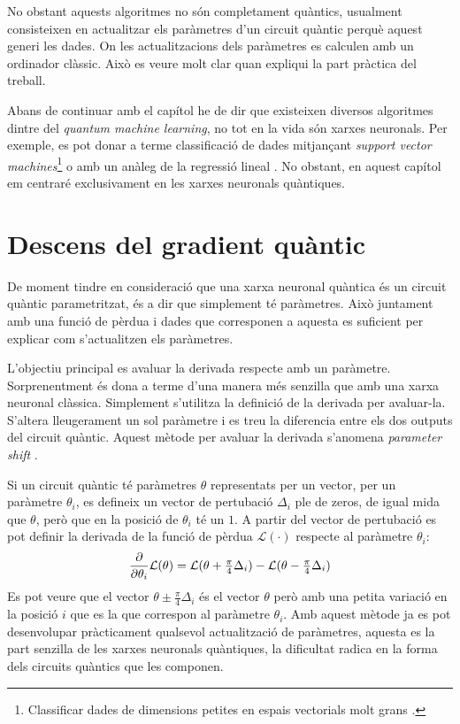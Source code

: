 No obstant aquests algoritmes no són completament quàntics, usualment consisteixen en actualitzar els paràmetres d'un circuit quàntic perquè aquest generi les dades. On les actualitzacions dels paràmetres es calculen amb un ordinador clàssic. Això es veure molt clar quan expliqui la part pràctica del treball. 

Abans de continuar amb el capítol he de dir que existeixen diversos algoritmes dintre del \textit{quantum machine learning}, no tot en la vida són xarxes neuronals. Per exemple, es pot donar a terme classificació de dades mitjançant \textit{support vector machines}\footnote{Classificar dades de dimensions petites en espais vectorials molt grans \cite{QSVM_2019, QSVM_xanadu_2019}.} o amb un anàleg de la regressió lineal \cite{Q_linear_regression_xanadu}. No obstant, en aquest capítol em centraré exclusivament en les xarxes neuronals quàntiques.

\section{Descens del gradient quàntic}
De moment tindre en consideració que una xarxa neuronal quàntica és un circuit quàntic parametritzat, és a dir que simplement té paràmetres. Això juntament amb una funció de pèrdua i dades que corresponen a aquesta es suficient per explicar com s'actualitzen els paràmetres. 

L'objectiu principal es avaluar la derivada respecte amb un paràmetre. Sorprenentment és dona a terme d'una manera més senzilla que amb una xarxa neuronal clàssica. Simplement s'utilitza la definició de la derivada per avaluar-la. S'altera lleugerament un sol paràmetre i es treu la diferencia entre els dos outputs del circuit quàntic. Aquest mètode per avaluar la derivada s'anomena \textit{parameter shift} \cite{tfq, shift_parameter_harrow_2019}. 

Si un circuit quàntic té paràmetres $\theta$ representats per un vector, per un paràmetre $\theta_{i}$, es defineix un vector de pertubació $\Delta_i$ ple de zeros, de igual mida que $\theta$, però que en la posició de $\theta_i$ té un $1$. A partir del vector de pertubació es pot definir la derivada de la funció de pèrdua $\mathcal{L}(\cdot)$ respecte al paràmetre $\theta_{i}$:
$$
\pdv{\theta_i} \mathcal{L}(\theta) = \mathcal{L}(\theta + \tfrac{\pi}{4}\Delta_i) - \mathcal{L}(\theta - \tfrac{\pi}{4}\Delta_i)
$$
Es pot veure que el vector $\theta \pm \frac{\pi}{4}\Delta_i$ és el vector $\theta$ però amb una petita variació en la posició $i$ que es la que correspon al paràmetre $\theta_i$. Amb aquest mètode ja es pot desenvolupar pràcticament qualsevol actualització de paràmetres, aquesta es la part senzilla de les xarxes neuronals quàntiques, la dificultat radica en la forma dels circuits quàntics que les componen.

